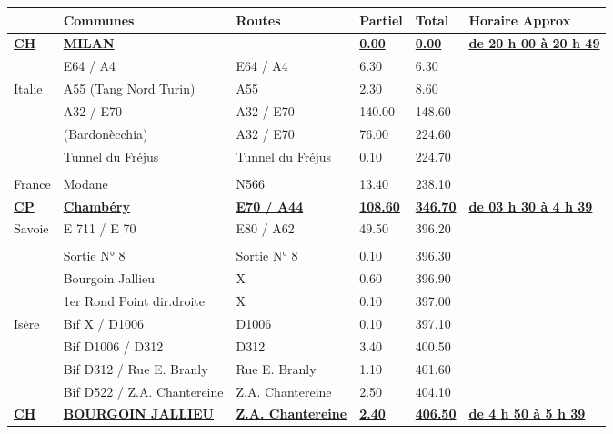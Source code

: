 \documentclass{article}%
\begin{document}
\begin{longtable}{p{2.25cm}|p{6.0cm}|p{3.0cm}|p{1.5cm}|p{1.5cm}|p{3.5cm}}%
\hline%
&Communes&Routes&Partiel&Total&Horaire Approx\\%
\hline%
\endhead%
\endfoot%
\endlastfoot%
\textbf{\underline{﻿CH}}&\textbf{\underline{MILAN}}& &\textbf{\underline{0.00}}&\textbf{\underline{0.00}}&\textbf{\underline{de 20 h 00 à 20 h 49}}\\%
 &E64 / A4 &E64 / A4 &6.30&6.30& \\%
Italie&A55 (Tang Nord Turin)&A55&2.30&8.60& \\%
 &A32 / E70&A32 / E70&140.00&148.60& \\%
 &(Bardonècchia)&A32 / E70&76.00&224.60& \\%
 &Tunnel du Fréjus&Tunnel du Fréjus&0.10&224.70& \\%
\hline& & & & & \\%
France&Modane&N566&13.40&238.10& \\%
\textbf{\underline{CP}}&\textbf{\underline{Chambéry}}&\textbf{\underline{E70 / A44}}&\textbf{\underline{108.60}}&\textbf{\underline{346.70}}&\textbf{\underline{de 03 h 30 à 4 h 39}}\\%
Savoie&E 711 / E 70 &E80 / A62&49.50&396.20& \\%
\hline& & & & & \\%
 &Sortie N° 8&Sortie N° 8&0.10&396.30& \\%
 &Bourgoin Jallieu&X&0.60&396.90& \\%
 &1er Rond Point dir.droite&X&0.10&397.00& \\%
Isère&Bif X / D1006&D1006&0.10&397.10& \\%
 &Bif D1006 / D312&D312&3.40&400.50& \\%
 &Bif D312 / Rue E. Branly&Rue E. Branly&1.10&401.60& \\%
 &Bif D522 / Z.A. Chantereine&Z.A. Chantereine&2.50&404.10& \\%
\textbf{\underline{CH }}&\textbf{\underline{BOURGOIN JALLIEU}}&\textbf{\underline{Z.A. Chantereine}}&\textbf{\underline{2.40}}&\textbf{\underline{406.50}}&\textbf{\underline{de 4 h 50 à 5 h 39}}\\%
\hline%
\end{longtable}%
\begin{flushleft} \textit{} \end{flushleft}%
\end{document}
